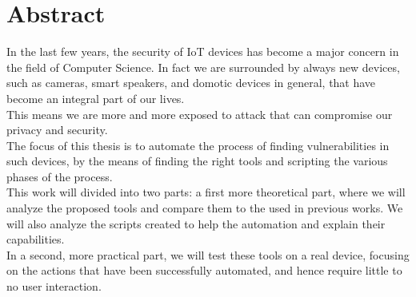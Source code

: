 \chapter*{Abstract} %
\label{abtract}


In the last few years, the security of IoT devices has become a major concern
in the field of Computer Science. In fact we are surrounded by always
new devices, such as cameras, smart speakers, and domotic devices in general,
that have become an integral part of our lives. \\
This means we are more and more exposed to attack that can compromise our
privacy and security. \\
The focus of this thesis is to automate the process of finding vulnerabilities
in such devices, by the means of finding the right tools and scripting the
various phases of the process. \\
This work will divided into two parts: a first more theoretical part, where
we will analyze the proposed tools and compare them to the used in previous works.
We will also analyze the scripts created to help the automation and explain their capabilities. \\
In a second, more practical part, we will test these tools on a real device,
focusing on the actions that have been successfully automated, and hence require
little to no user interaction. \\ 

\newpage